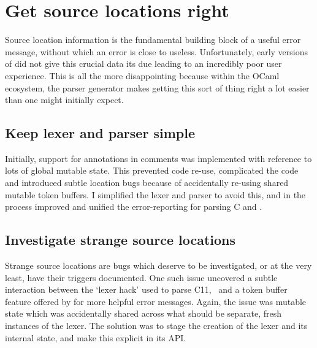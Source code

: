 \section{Get source locations right}

Source location information is the fundamental building block of a useful error
message, without which an error is close to useless. Unfortunately, early
versions of  did not give this crucial data its due leading to an
incredibly poor user experience. This is all the more disappointing because
within the OCaml ecosystem, the  parser generator makes getting this
sort of thing right a lot easier than one might initially
expect.~

\subsection{Keep lexer and parser simple}

Initially, support for 
annotations in comments was implemented with reference to lots of global
mutable state.
This prevented code re-use, complicated the code and introduced subtle
location bugs because of accidentally re-using shared mutable token
buffers. I simplified the lexer and parser to avoid this, and in the
process improved and unified the error-reporting for parsing C and
.

\subsection{Investigate strange source locations}

Strange source locations are
bugs which deserve to be investigated, or at the very least, have their
triggers documented. One such
issue uncovered a subtle interaction between the `lexer hack' used to parse
C11,~ and a token buffer feature offered by
 for more helpful error messages. Again, the issue was mutable state
which was accidentally shared across what should be separate, fresh instances
of the lexer. The solution was to stage the creation of the lexer and its
internal state, and make this explicit in its
API.

